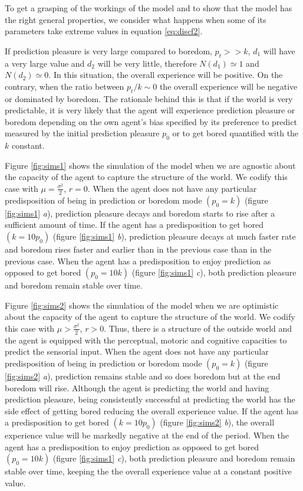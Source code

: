 \documentclass[11pt,twocolumn]{article}
\begin{document}
To get a grasping of the workings of the model and to show that the model has the right general properties, we consider what happens when some of its parameters take extreme values in equation \ref{eq:discf2}.

If prediction pleasure is very large compared to boredom, $p_t >> k$, $d_1$ will have a very large value and $d_2$ will be very little, therefore $N(d_1) \simeq 1$ and $N(d_2) \simeq 0$. In this situation, the overall experience will be positive. On the contrary, when the ratio between $p_t/k \sim 0$ the overall experience will be negative or dominated by boredom. 
The rationale behind this is that if the world is very predictable, it is very likely that the agent will experience prediction pleasure or boredom depending on the own agent's bias specified by its preference to predict measured by the initial prediction pleasure $p_0$ or to get bored quantified with the $k$ constant.

Figure \ref{fig:sims1} shows the simulation of the model when we are agnostic about the capacity  of the agent to capture the structure of the world. We codify this case with $ \mu = \frac{\sigma ^2}{2}$, $r=0$. When the agent does not have any particular predisposition of being in prediction or boredom mode $( p_0 = k )$ (figure \ref{fig:sims1} \emph{a}), prediction pleasure decays and boredom starts to rise after a sufficient amount of time. If the agent has a predisposition to  get bored $( k = 10p_0 )$ (figure \ref{fig:sims1} \emph{b}), prediction pleasure decays at much faster rate and boredom rises faster and earlier than in the previous case than in the previous case. When the agent has a predisposition to enjoy prediction as opposed to get bored $( p_0 = 10k )$ (figure \ref{fig:sims1} \emph{c}), both prediction pleasure and boredom remain stable over time.

Figure \ref{fig:sims2} shows the simulation of the model when we are optimistic about the capacity  of the agent to capture the structure of the world. We codify this case with $ \mu > \frac{\sigma ^2}{2}$, $r>0$. Thus, there  is a structure of the outside world and the agent is equipped with the perceptual, motoric and cognitive capacities to predict the sensorial input.
When the agent does not have any particular predisposition of being in prediction or boredom mode $( p_0 = k )$ (figure \ref{fig:sims2} \emph{a}), prediction remains stable and so does boredom but at the end boredom will rise. Although the agent is predicting the world and having prediction pleasure, being consistently successful at predicting the world has the side effect of getting bored reducing the overall experience value. 
If the agent has a predisposition to  get bored $( k = 10p_0 )$ (figure \ref{fig:sims2} \emph{b}), the overall experience value will be markedly negative at the end of the period. When the agent has a predisposition to enjoy prediction as opposed to get bored $( p_0 = 10k )$ (figure \ref{fig:sims1} \emph{c}), both prediction pleasure and boredom remain stable over time, keeping the the overall experience value at a constant positive value.
\end{document}
